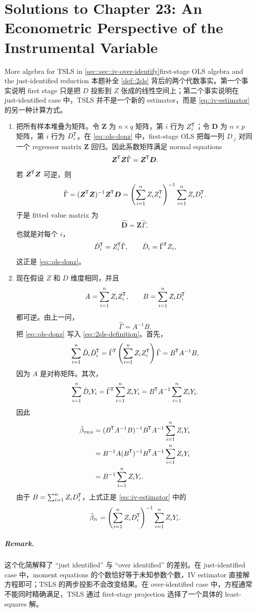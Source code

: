 \chapter{Solutions to Chapter 23: An Econometric Perspective of the Instrumental Variable}
\label{sol:chapter23}

\begin{exercisesolution}{More algebra for TSLS in \cref{sec::sec::iv-over-identify}}{first-stage OLS algebra and the just-identified reduction}
本题补全 \cref{def::2sls} 背后的两个代数事实。第一个事实说明 first stage 只是把 $D$ 投影到 $Z$ 张成的线性空间上；第二个事实说明在 just-identified case 中，TSLS 并不是一个新的 estimator，而是 \cref{eq::iv-estimator} 的另一种计算方式。

\begin{enumerate}
\item
把所有样本堆叠为矩阵。令 $\boldsymbol{Z}$ 为 $n\times q$ 矩阵，第 $i$ 行为 $Z_i^{\mkern-1.5mu\mathsf{T}}$；令 $\boldsymbol{D}$ 为 $n\times p$ 矩阵，第 $i$ 行为 $D_i^{\mkern-1.5mu\mathsf{T}}$。在 \cref{eq::ols-donz} 中，first-stage OLS 把每一列 $D_{\cdot j}$ 对同一个 regressor matrix $\boldsymbol{Z}$ 回归。因此系数矩阵满足 normal equations
\[
\boldsymbol{Z}^{\mkern-1.5mu\mathsf{T}} \boldsymbol{Z}\hat{\Gamma}
=
\boldsymbol{Z}^{\mkern-1.5mu\mathsf{T}} \boldsymbol{D}.
\]
若 $\boldsymbol{Z}^{\mkern-1.5mu\mathsf{T}} \boldsymbol{Z}$ 可逆，则
\[
\hat{\Gamma}
=
(\boldsymbol{Z}^{\mkern-1.5mu\mathsf{T}} \boldsymbol{Z})^{-1}\boldsymbol{Z}^{\mkern-1.5mu\mathsf{T}} \boldsymbol{D}
=
\left(\sum_{i=1}^n Z_iZ_i^{\mkern-1.5mu\mathsf{T}}\right)^{-1}\sum_{i=1}^n Z_iD_i^{\mkern-1.5mu\mathsf{T}}.
\]
于是 fitted value matrix 为
\[
\hat{\boldsymbol{D}}
=\boldsymbol{Z}\hat{\Gamma},
\]
也就是对每个 $i$，
\[
\hat{D}_i^{\mkern-1.5mu\mathsf{T}}=Z_i^{\mkern-1.5mu\mathsf{T}}\hat{\Gamma},
\qquad
\hat{D}_i=\hat{\Gamma}^{\mkern-1.5mu\mathsf{T}} Z_i,
\]
这正是 \cref{eq::ols-donz}。

\item
现在假设 $Z$ 和 $D$ 维度相同，并且
\[
A=\sum_{i=1}^n Z_iZ_i^{\mkern-1.5mu\mathsf{T}},\qquad
B=\sum_{i=1}^n Z_iD_i^{\mkern-1.5mu\mathsf{T}}
\]
都可逆。由上一问，
\[
\hat{\Gamma}=A^{-1}B.
\]
把 \cref{eq::ols-donz} 写入 \cref{eq::2sls-definition}。首先，
\[
\sum_{i=1}^n \hat{D}_i\hat{D}_i^{\mkern-1.5mu\mathsf{T}}
=
\hat{\Gamma}^{\mkern-1.5mu\mathsf{T}}\left(\sum_{i=1}^n Z_iZ_i^{\mkern-1.5mu\mathsf{T}}\right)\hat{\Gamma}
=
B^{\mkern-1.5mu\mathsf{T}} A^{-1}B,
\]
因为 $A$ 是对称矩阵。其次，
\[
\sum_{i=1}^n \hat{D}_iY_i
=
\hat{\Gamma}^{\mkern-1.5mu\mathsf{T}}\sum_{i=1}^n Z_iY_i
=
B^{\mkern-1.5mu\mathsf{T}} A^{-1}\sum_{i=1}^n Z_iY_i.
\]
因此
\begin{align*}
\hat{\beta}_\textsc{tsls}
&=
(B^{\mkern-1.5mu\mathsf{T}} A^{-1}B)^{-1}B^{\mkern-1.5mu\mathsf{T}} A^{-1}\sum_{i=1}^n Z_iY_i  \\
&=
B^{-1}A(B^{\mkern-1.5mu\mathsf{T}})^{-1}B^{\mkern-1.5mu\mathsf{T}} A^{-1}\sum_{i=1}^n Z_iY_i  \\
&=
B^{-1}\sum_{i=1}^n Z_iY_i.
\end{align*}
由于 $B=\sum_{i=1}^n Z_iD_i^{\mkern-1.5mu\mathsf{T}}$，上式正是 \cref{eq::iv-estimator} 中的
\[
\hat{\beta}_\textsc{iv}
=
\left(\sum_{i=1}^n Z_iD_i^{\mkern-1.5mu\mathsf{T}}\right)^{-1}\sum_{i=1}^n Z_iY_i.
\]
\end{enumerate}

\paragraph{Remark.}
这个化简解释了 ``just identified'' 与 ``over identified'' 的差别。在 just-identified case 中，moment equations 的个数恰好等于未知参数个数，IV estimator 直接解方程即可；TSLS 的两步投影不会改变结果。在 over-identified case 中，方程通常不能同时精确满足，TSLS 通过 first-stage projection 选择了一个具体的 least-squares 解。
\end{exercisesolution}

